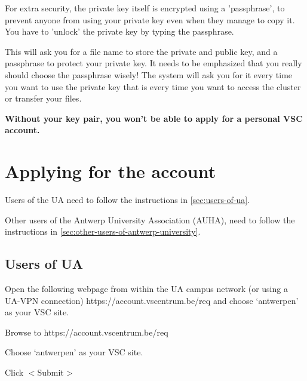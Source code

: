   For extra security, the private key itself is encrypted using a 'passphrase',
  to prevent anyone from using your private key even when they manage to copy
  it. You have to 'unlock' the private key by typing the passphrase.


  This will ask you for a file name to store the private and public key, and a
  passphrase to protect your private key. It needs to be emphasized that you
  really should choose the passphrase wisely! The system will ask you for it
  every time you want to use the private key that is every time you want to
  access the cluster or transfer your files.

  \textbf{Without your key pair, you won't be able to apply for a personal VSC account.}

\fi

\section{Applying for the account}
\label{sec:applying-for-the-account}

Users of the UA need to follow the instructions in \autoref{sec:users-of-ua}.

Other users of the Antwerp University Association (AUHA), need to follow the
instructions in \autoref{sec:other-users-of-antwerp-university}.

\subsection{Users of UA}
\label{sec:users-of-ua}

Open the following webpage from within the UA campus network (or using a UA-VPN
connection) https://account.vscentrum.be/req and choose `antwerpen' as your VSC
site.

Browse to https://account.vscentrum.be/req

Choose `antwerpen' as your VSC site.

Click $<$Submit$>$

